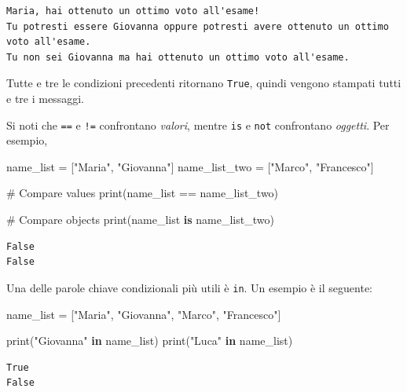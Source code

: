 \documentclass[
  letterpaper,
  krantz2]{{[}./krantz{]}}
\newenvironment{Shaded}{\begin{snugshade}}{\end{snugshade}}
\newcommand{\BuiltInTok}[1]{\textcolor[rgb]{0.00,0.23,0.31}{#1}}
\newcommand{\CommentTok}[1]{\textcolor[rgb]{0.37,0.37,0.37}{#1}}
\newcommand{\KeywordTok}[1]{\textcolor[rgb]{0.00,0.23,0.31}{\textbf{#1}}}
\newcommand{\NormalTok}[1]{\textcolor[rgb]{0.00,0.23,0.31}{#1}}
\newcommand{\OperatorTok}[1]{\textcolor[rgb]{0.37,0.37,0.37}{#1}}
\newcommand{\StringTok}[1]{\textcolor[rgb]{0.13,0.47,0.30}{#1}}
\begin{document}
\begin{verbatim}
Maria, hai ottenuto un ottimo voto all'esame!
Tu potresti essere Giovanna oppure potresti avere ottenuto un ottimo voto all'esame.
Tu non sei Giovanna ma hai ottenuto un ottimo voto all'esame.
\end{verbatim}

Tutte e tre le condizioni precedenti ritornano \texttt{True}, quindi
vengono stampati tutti e tre i messaggi.

Si noti che \texttt{==} e \texttt{!=} confrontano \emph{valori}, mentre
\texttt{is} e \texttt{not} confrontano \emph{oggetti}. Per esempio,

\begin{Shaded}
\begin{Highlighting}[]
\NormalTok{name\_list }\OperatorTok{=}\NormalTok{ [}\StringTok{"Maria"}\NormalTok{, }\StringTok{"Giovanna"}\NormalTok{]}
\NormalTok{name\_list\_two }\OperatorTok{=}\NormalTok{ [}\StringTok{"Marco"}\NormalTok{, }\StringTok{"Francesco"}\NormalTok{]}

\CommentTok{\# Compare values}
\BuiltInTok{print}\NormalTok{(name\_list }\OperatorTok{==}\NormalTok{ name\_list\_two)}

\CommentTok{\# Compare objects}
\BuiltInTok{print}\NormalTok{(name\_list }\KeywordTok{is}\NormalTok{ name\_list\_two)}
\end{Highlighting}
\end{Shaded}

\begin{verbatim}
False
False
\end{verbatim}

Una delle parole chiave condizionali più utili è \texttt{in}. Un esempio
è il seguente:

\begin{Shaded}
\begin{Highlighting}[]
\NormalTok{name\_list }\OperatorTok{=}\NormalTok{ [}\StringTok{"Maria"}\NormalTok{, }\StringTok{"Giovanna"}\NormalTok{, }\StringTok{"Marco"}\NormalTok{, }\StringTok{"Francesco"}\NormalTok{]}

\BuiltInTok{print}\NormalTok{(}\StringTok{"Giovanna"} \KeywordTok{in}\NormalTok{ name\_list)}
\BuiltInTok{print}\NormalTok{(}\StringTok{"Luca"} \KeywordTok{in}\NormalTok{ name\_list)}
\end{Highlighting}
\end{Shaded}

\begin{verbatim}
True
False
\end{verbatim}
\end{document}
